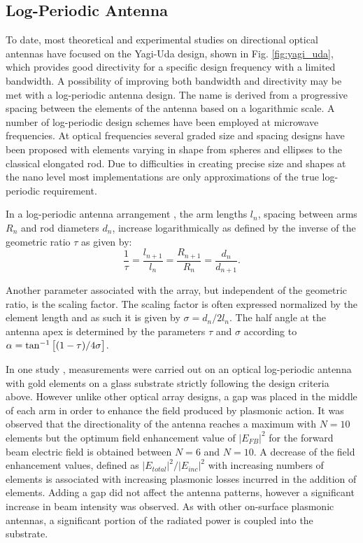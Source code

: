 \documentclass[11pt]{article}
\begin{document}
\subsection{Log-Periodic Antenna}
%
To date, most theoretical and experimental studies on directional optical antennas have focused on the Yagi-Uda design, shown in Fig. \ref{fig:yagi_uda}, which provides good directivity for a specific design frequency with a limited bandwidth. A possibility of improving both bandwidth and directivity may be met with a log-periodic antenna design. The name is derived from a progressive spacing between the elements of the antenna based on a logarithmic scale. A number of log-periodic design schemes have been employed at microwave frequencies. At optical frequencies several graded size and spacing designs have been proposed with elements varying in shape from spheres and ellipses to the classical elongated rod. Due to difficulties in creating precise size and shapes at the nano level most implementations are only approximations of the true log-periodic requirement.

In a log-periodic antenna arrangement \cite{Balanis2015}, the arm lengths $l_n$, spacing between arms $R_n$ and rod diameters $d_n$, increase logarithmically as defined by the inverse of the geometric ratio $\tau$ as given by:
%
\begin{equation}
  \frac{1}{\tau} = \frac{l_{n + 1}}{l_n} = \frac{R_{n + 1}}{R_n} = \frac{d_n}{d_{n + 1}}.
  \label{eq:logperiodic}
\end{equation}

Another parameter associated with the array, but independent of the geometric ratio, is the scaling factor. The scaling factor is often expressed normalized by the element length and as such it is given by $\sigma  = d_n/ {2 l_n}$. The half angle at the antenna apex is determined by the parameters $\tau$ and $\sigma$ according to $\alpha  = \tan ^{-1}\left[(1 - \tau)/{4 \sigma} \right]$.

In one study \cite{Pavlov2012}, measurements were carried out on an optical log-periodic antenna with gold elements on a glass substrate strictly following the design criteria above. However unlike other optical array designs, a gap was placed in the middle of each arm in order to enhance the field produced by plasmonic action. It was observed that the directionality of the antenna reaches a maximum with $N = 10$ elements but the optimum field enhancement value of $|E_{FB}|^2$ for the forward beam electric field is obtained between $N = 6$ and $N = 10$. A decrease of the field enhancement values, defined as $|E_{total}|^2/|E_{inc}|^2$ with increasing numbers of elements is associated with increasing plasmonic losses incurred in the addition of elements. Adding a gap did not affect the antenna patterns, however a significant increase in beam intensity was observed. As with other on-surface plasmonic antennas, a significant portion of the radiated power is coupled into the substrate.
\end{document}
